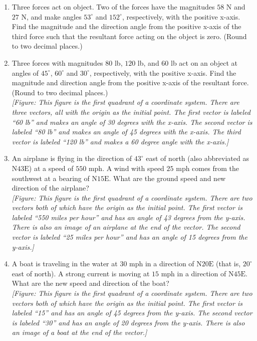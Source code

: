 \documentclass{exercises}
\begin{document}
\begin{enumerate}[resume]
\item \techrequired Three forces act on object. Two of the forces have the magnitudes $58$ N and $27$ N, and make angles $53^\circ$ and $152^\circ$, respectively, with the positive x-axis. Find the magnitude and the direction angle from the positive x-axis of the third force such that the resultant force acting on the object is zero. (Round to two decimal places.)
\item Three forces with magnitudes $80$ lb, $120$ lb, and $60$ lb act on an object at angles of $45^\circ$, $60^\circ$ and $30^\circ$, respectively, with the positive x-axis. Find the magnitude and direction angle from the positive x-axis of the resultant force. (Round to two decimal places.) \\ \textit{[Figure: This figure is the first quadrant of a coordinate system. There are three vectors, all with the origin as the initial point. The first vector is labeled ``60 lb'' and makes an angle of 30 degrees with the x-axis. The second vector is labeled ``80 lb'' and makes an angle of 45 degrees with the x-axis. The third vector is labeled ``120 lb'' and makes a 60 degree angle with the x-axis.]}
\item \techrequired An airplane is flying in the direction of $43^\circ$ east of north (also abbreviated as $\text{N}43\text{E}$) at a speed of $550$ mph. A wind with speed $25$ mph comes from the southwest at a bearing of $\text{N}15\text{E}$. What are the ground speed and new direction of the airplane? \\ \textit{[Figure: This figure is the first quadrant of a coordinate system. There are two vectors both of which have the origin as the initial point. The first vector is labeled ``550 miles per hour'' and has an angle of 43 degrees from the y-axis. There is also an image of an airplane at the end of the vector. The second vector is labeled ``25 miles per hour'' and has an angle of 15 degrees from the y-axis.]}
\item \techrequired A boat is traveling in the water at $30$ mph in a direction of $\text{N}20\text{E}$ (that is, $20^\circ$ east of north). A strong current is moving at $15$ mph in a direction of $\text{N}45\text{E}$. What are the new speed and direction of the boat? \\ \textit{[Figure: This figure is the first quadrant of a coordinate system. There are two vectors both of which have the origin as the initial point. The first vector is labeled ``15'' and has an angle of 45 degrees from the y-axis. The second vector is labeled ``30'' and has an angle of 20 degrees from the y-axis. There is also an image of a boat at the end of the vector.]}

\end{enumerate}
\end{document}

